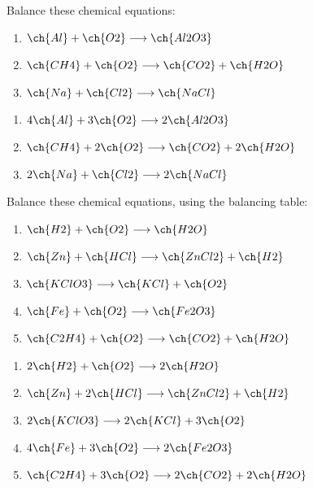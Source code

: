 \begin{exercise}
    Balance these chemical equations:
    \begin{enumerate}[label=\letraminuscula]
        \item \(\ch{Al} + \ch{O2} \longrightarrow \ch{Al2O3}\)
        \item \(\ch{CH4} + \ch{O2} \longrightarrow \ch{CO2} + \ch{H2O}\)
        \item \(\ch{Na} + \ch{Cl2} \longrightarrow \ch{NaCl}\)
    \end{enumerate}
    \begin{solu}
        \begin{enumerate}[label=\alph*)]
            \item \(4\ch{Al} + 3\ch{O2} \longrightarrow 2\ch{Al2O3}\)
            \item \(\ch{CH4} + 2\ch{O2} \longrightarrow \ch{CO2} + 2\ch{H2O}\)
            \item \(2\ch{Na} + \ch{Cl2} \longrightarrow 2\ch{NaCl}\)
        \end{enumerate}
    \end{solu}
\end{exercise}

\begin{exercise}
    Balance these chemical equations, using the balancing table:
    \begin{enumerate}[label=\letraminuscula]
        \item \(\ch{H2} + \ch{O2} \longrightarrow \ch{H2O}\)
        \item \(\ch{Zn} + \ch{HCl} \longrightarrow \ch{ZnCl2} + \ch{H2}\)
        \item \(\ch{KClO3} \longrightarrow \ch{KCl} + \ch{O2}\)
        \item \(\ch{Fe} + \ch{O2} \longrightarrow \ch{Fe2O3}\)
        \item \(\ch{C2H4} + \ch{O2} \longrightarrow \ch{CO2} + \ch{H2O}\)
    \end{enumerate}
    \begin{solu}
        \begin{enumerate}[label=\alph*)]
            \item \(2\ch{H2} + \ch{O2} \longrightarrow 2\ch{H2O}\)
            \item \(\ch{Zn} + 2\ch{HCl} \longrightarrow \ch{ZnCl2} + \ch{H2}\)
            \item \(2\ch{KClO3} \longrightarrow 2\ch{KCl} + 3\ch{O2}\)
            \item \(4\ch{Fe} + 3\ch{O2} \longrightarrow 2\ch{Fe2O3}\)
            \item \(\ch{C2H4} + 3\ch{O2} \longrightarrow 2\ch{CO2} + 2\ch{H2O}\)
        \end{enumerate}
    \end{solu}
\end{exercise}

